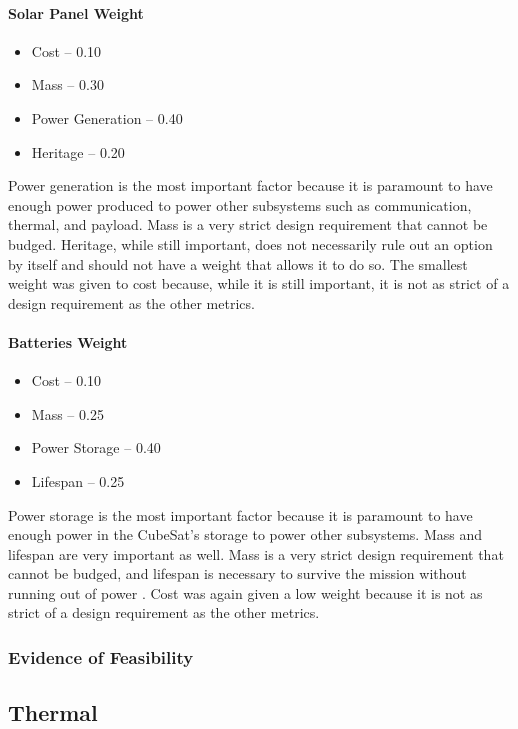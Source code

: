 \documentclass[3p]{elsarticle}
\begin{document}
\paragraph{Solar Panel Weight}
\begin{itemize}
    \item Cost – 0.10
    \item Mass – 0.30
    \item Power Generation – 0.40
    \item Heritage – 0.20
\end{itemize}
Power generation is the most important factor because it is paramount to have enough power produced to power other subsystems such as communication, thermal, and payload.  Mass is a very strict design requirement that cannot be budged.  Heritage, while still important, does not necessarily rule out an option by itself and should not have a weight that allows it to do so.  The smallest weight was given to cost because, while it is still important, it is not as strict of a design requirement as the other metrics.
\paragraph{Batteries Weight}
\begin{itemize}
    \item Cost – 0.10
    \item Mass – 0.25
    \item Power Storage – 0.40
    \item Lifespan – 0.25
\end{itemize}    
Power storage is the most important factor because it is paramount to have enough power in the CubeSat's storage to power other subsystems.  Mass and lifespan are very important as well.  Mass is a very strict design requirement that cannot be budged, and lifespan is necessary to survive the mission without running out of power .  Cost was again given a low weight because it is not as strict of a design requirement as the other metrics.
\subsubsection{Evidence of Feasibility}
\subsection{Thermal}
\end{document}
